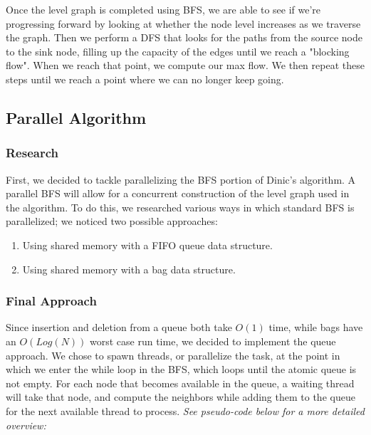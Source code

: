     Once the level graph is completed using BFS, we are able to see if we're progressing forward by looking at whether the node level increases as we traverse the graph. Then we perform a DFS that looks for the paths from the source node to the sink node, filling up the capacity of the edges until we reach a "blocking flow". When we reach that point, we compute our max flow. We then repeat these steps until we reach a point where we can no longer keep going. 
    
\subsection{Parallel Algorithm}
    \subsubsection{Research}
        First, we decided to tackle parallelizing the BFS portion of Dinic's algorithm. A parallel BFS will allow for a concurrent construction of the level graph used in the algorithm. To do this, we researched various ways in which standard BFS is parallelized; we noticed two possible approaches:
            \begin{enumerate}
                \item Using shared memory with a FIFO queue data structure.
                \item Using shared memory with a bag data structure.
            \end{enumerate}
    
    \subsubsection{Final Approach}
        Since insertion and deletion from a queue both take $O(1)$ time, while bags have an $O(Log(N))$ worst case run time, we decided to implement the queue approach. We chose to spawn threads, or parallelize the task, at the point in which we enter the while loop in the BFS, which loops until the atomic queue is not empty. For each node that becomes available in the queue, a waiting thread will take that node, and compute the neighbors while adding them to the queue for the next available thread to process. \emph{See pseudo-code below for a more detailed overview:}\\
        
